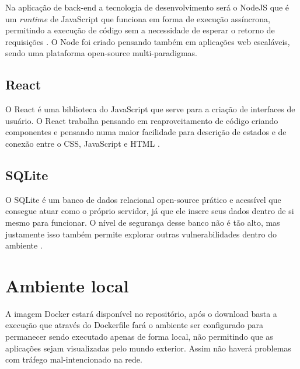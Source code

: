 Na aplicação de back-end a tecnologia de desenvolvimento será o NodeJS que é um \textit{runtime} de JavaScript que funciona em forma de execução assíncrona, permitindo a execução de código sem a necessidade de esperar o retorno de requisições \cite{7960064}. O Node foi criado pensando também em aplicações web escaláveis, sendo uma plataforma open-source multi-paradigmas.

\subsection{React}

O React é uma biblioteca do JavaScript que serve para a criação de interfaces de usuário. O React trabalha pensando em reaproveitamento de código criando componentes e pensando numa maior facilidade para descrição de estados e de conexão entre o CSS, JavaScript e HTML \cite{url:react}.

\subsection{SQLite}

O SQLite é um banco de dados relacional open-source prático e acessível que consegue atuar como o próprio servidor, já que ele insere seus dados dentro de si mesmo para funcionar. O nível de segurança desse banco não é tão alto, mas justamente isso também permite explorar outras vulnerabilidades dentro do ambiente \cite{5231398}.

\section{Ambiente local}

A imagem Docker estará disponível no repositório, após o download basta a execução que através do Dockerfile fará o ambiente ser configurado para permanecer sendo executado apenas de forma local, não permitindo que as aplicações sejam visualizadas pelo mundo exterior. Assim não haverá problemas com tráfego mal-intencionado na rede.